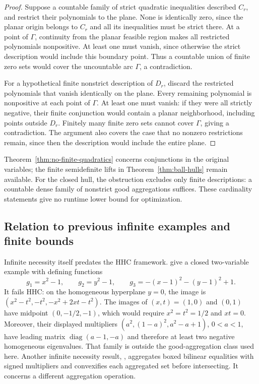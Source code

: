 \begin{proof}
Suppose a countable family of strict quadratic inequalities described
$C_r$, and restrict their polynomials to the plane. None is
identically zero, since the planar origin belongs to $C_r$ and
all its inequalities must be strict there. At a point of
$\Gamma$, continuity from the planar feasible region makes
all restricted polynomials nonpositive. At least one must
vanish, since otherwise the strict description would include
this boundary point. Thus a countable union of finite zero sets
would cover the uncountable arc $\Gamma$, a contradiction.

For a hypothetical finite nonstrict description of $D_r$, discard the
restricted polynomials that vanish identically on the plane.
Every remaining polynomial is nonpositive at each point of
$\Gamma$. At least one must vanish: if they were all strictly
negative, their finite conjunction would contain a planar
neighborhood, including points outside $D_r$. Finitely many finite
zero sets cannot cover $\Gamma$, giving a contradiction. The argument also covers the
case that no nonzero restrictions remain, since then the
description would include the entire plane.
\end{proof}

Theorem~\ref{thm:no-finite-quadratics} concerns conjunctions in
the original variables; the finite semidefinite lifts in
Theorem~\ref{thm:ball-hulls} remain available. For the closed hull,
the obstruction excludes only finite descriptions: a countable dense
family of nonstrict good aggregations suffices. These cardinality
statements give no runtime lower bound for optimization.

\subsection{Relation to previous infinite examples and finite bounds}

Infinite necessity itself predates the HHC framework.
\citet[Proposition~2.8 and Section~7.4]{DMS2022} give a closed
two-variable example with defining functions
\[
 g_1=x^2-1,\qquad g_2=y^2-1,\qquad
 g_3=-(x-1)^2-(y-1)^2+1.
\]
It fails HHC: on the homogeneous hyperplane $y=0$, the image is
$(x^2-t^2,-t^2,-x^2+2xt-t^2)$. The images of $(x,t)=(1,0)$
and $(0,1)$ have midpoint $(0,-1/2,-1)$, which would require
$x^2=t^2=1/2$ and $xt=0$. Moreover, their displayed
multipliers $(a^2,(1-a)^2,a^2-a+1)$, $0<a<1$, have leading
matrix $\operatorname{diag}(a-1,-a)$ and therefore at least
two negative homogeneous eigenvalues. That family is outside
the good-aggregation class used here. Another infinite
necessity result, \citet[Theorem~2]{DeyHanWang2026}, aggregates
boxed bilinear equalities with signed multipliers and convexifies
each aggregated set before intersecting. It concerns a
different aggregation operation.

